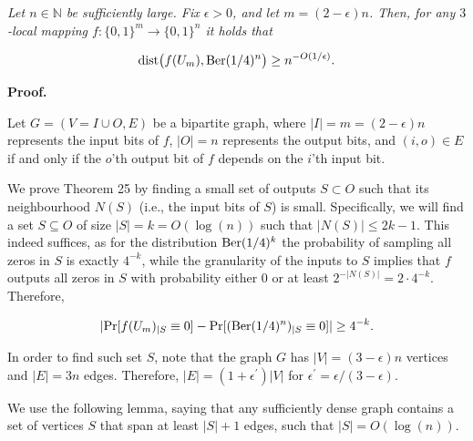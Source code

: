 \documentclass[10pt,a4paper]{article}
\begin{document}
\emph{Let $n\in\mathbb{N}$ be sufficiently large.
Fix $\epsilon>0$, and let $m=(2-\epsilon)n$.
Then, for any $3$-local mapping $f\colon\{0,1\}^{m}\to\{0,1\}^{n}$ it holds that}\par


\[\begin{gathered}
\mathrm{dist}\bigl(f(U_{m}),\textnormal{Ber}(1/4)^{n}\bigr)\geq n^{-O(1/\epsilon)}.
\end{gathered}\]






\par\medskip\noindent\textbf{Proof.}\par




Let $G=(V=I\cup O,E)$ be a bipartite graph, where $|I|=m=(2-\epsilon)n$ represents the input bits of $f$, $|O|=n$ represents the output bits, and $(i,o)\in E$ if and only if the $o$’th output bit of $f$ depends on the $i$’th input bit.\par




We prove Theorem 25 by finding a small set of outputs $S\subset O$ such that its neighbourhood $N(S)$ (i.e., the input bits of $S$) is small. Specifically, we will find a set $S\subseteq O$ of size $\lvert S\rvert=k=O(\log(n))$ such that $\lvert N(S)\rvert\leq 2k-1$. This indeed suffices, as for the distribution $\textnormal{Ber}(1/4)^{k}$ the probability of sampling all zeros in $S$ is exactly $4^{-k}$, while the granularity of the inputs to $S$ implies that $f$ outputs all zeros in $S$ with probability either 0 or at least $2^{-\lvert N(S)\rvert}=2\cdot 4^{-k}$. Therefore,\par


\[\begin{gathered}
\lvert\Pr[f(U_{m})_{|S}\equiv 0]-\Pr[(\textnormal{Ber}(1/4)^{n})_{|S}\equiv 0]\rvert\geq 4^{-k}.
\end{gathered}\]




In order to find such set $S$, note that the graph $G$ has $\lvert V\rvert=(3-\epsilon)n$ vertices and $\lvert E\rvert=3n$ edges. Therefore, $\lvert E\rvert=(1+\epsilon^{\prime})\lvert V\rvert$ for $\epsilon^{\prime}=\epsilon/(3-\epsilon)$.\par




We use the following lemma, saying that any sufficiently dense graph contains a set of vertices $S$ that span at least $|S|+1$ edges, such that $|S|=O(\log(n))$.\par
\end{document}
